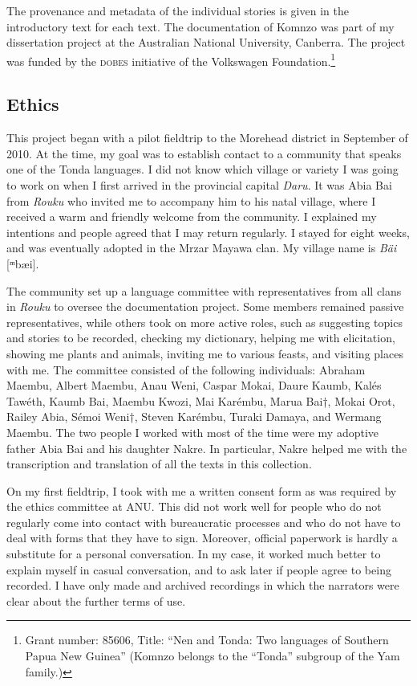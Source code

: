 The provenance and metadata of the individual stories is given in the introductory text for each text. The documentation of Komnzo was part of my dissertation project at the Australian National University, Canberra. The project was funded by the \textsc{dobes} initiative of the Volkswagen Foundation.\footnote{Grant number: 85606, Title: ``Nen and Tonda: Two languages of Southern Papua New Guinea'' (Komnzo belongs to the ``Tonda'' subgroup of the Yam family.)}

\subsection{Ethics}

This project began with a pilot fieldtrip to the Morehead district in September of 2010. At the time, my goal was to establish contact to a community that speaks one of the Tonda languages. I did not know which village or variety I was going to work on when I first arrived in the provincial capital \textit{Daru}. It was Abia Bai from \textit{Rouku} who invited me to accompany him to his natal village, where I received a warm and friendly welcome from the community. I explained my intentions and people agreed that I may return regularly. I stayed for eight weeks, and was eventually adopted in the Mrzar Mayawa clan. My village name is \textit{Bäi} [ᵐbæi].

The community set up a language committee with representatives from all clans in \textit{Rouku} to oversee the documentation project. Some members remained passive representatives, while others took on more active roles, such as suggesting topics and stories to be recorded, checking my dictionary, helping me with elicitation, showing me plants and animals, inviting me to various feasts, and visiting places with me. The committee consisted of the following individuals: Abraham Maembu, Albert Maembu, Anau Weni, Caspar Mokai, Daure Kaumb, Kalés Tawéth, Kaumb Bai, Maembu Kwozi, Mai Karémbu, Marua Bai†, Mokai Orot, Railey Abia, Sémoi Weni†, Steven Karémbu, Turaki Damaya, and Wermang Maembu. The two people I worked with most of the time were my adoptive father Abia Bai and his daughter Nakre. In particular, Nakre helped me with the transcription and translation of all the texts in this collection.

On my first fieldtrip, I took with me a written consent form as was required by the ethics committee at ANU. This did not work well for people who do not regularly come into contact with bureaucratic processes and who do not have to deal with forms that they have to sign. Moreover, official paperwork is hardly a substitute for a personal conversation. In my case, it worked much better to explain myself in casual conversation, and to ask later if people agree to being recorded. I have only made and archived recordings in which the narrators were clear about the further terms of use.

